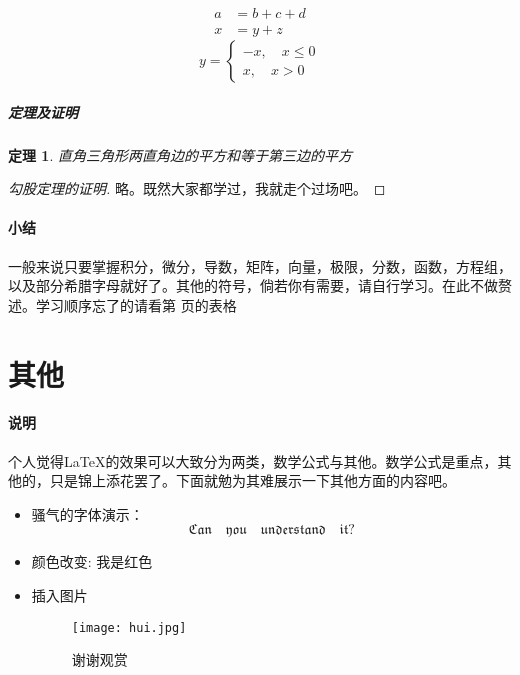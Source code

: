 \documentclass[UTF8,11pt,titlepage,a4paper]{ctexart}
\newtheorem{theorem}{定理}[section]
\begin{document}
   	\begin{align}
   	a &= b+c+d \\
   	x &= y+z
   	\end{align}
 \begin{equation}
 	y=\begin{cases}
 	-x,\quad x\leq 0 \\
 	x,\quad x>0
 	\end{cases}
 \end{equation}   
   \subparagraph*{定理及证明}
   \begin{theorem}
   	直角三角形两直角边的平方和等于第三边的平方
   \end{theorem}
   \begin{proof}[勾股定理的证明]
   	略。既然大家都学过，我就走个过场吧。
   \end{proof}
    \paragraph*{小结}
    一般来说只要掌握积分，微分，导数，矩阵，向量，极限，分数，函数，方程组，以及部分希腊字母就好了。其他的符号，倘若你有需要，请自行学习。在此不做赘述。学习顺序忘了的请看第 \pageref*{marker} 页的表格 \\
    \section{其他}
    \paragraph*{说明}个人觉得\LaTeX 的效果可以大致分为两类，数学公式与其他。数学公式是重点，其他的，只是锦上添花罢了。下面就勉为其难展示一下其他方面的内容吧。
    \begin{itemize}
    	\item 骚气的字体演示： \[ \mathfrak{Can\quad you \quad understand \quad it?} \]
        \item 颜色改变:  \qquad \qquad \qquad  \textcolor[RGB]{255,0,0}{我是红色}
        \item 插入图片
        \begin{figure}[htbp]
        	\centering
        	\texttt{[image: hui.jpg]}
        	\caption{谢谢观赏}
        	\label{fig:myphoto}
        	\end{figure}
    \end{itemize}
    
\end{document}
